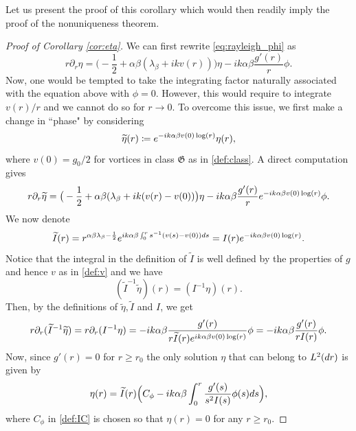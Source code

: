 \documentclass[11pt,reqno]{amsproc}
\def\dd{{\rm d}}
\def\e{{\rm e}}
\def\de{{\partial}}
\theoremstyle{definition}
\theoremstyle{definition}
\numberwithin{equation}{section}
\begin{document}
Let us present the proof of this corollary which would then readily imply the proof of the nonuniqueness theorem.
\begin{proof}[Proof of Corollary \ref{cor:eta}]
    We can first  rewrite \cref{eq:rayleigh_phi} as 
\begin{equation}
    r\de_r \eta=\big(-\frac12+\alpha\beta(\lambda_\beta+ikv(r))\big)\eta-ik\alpha\beta\frac{g'(r)}{r}\phi.
\end{equation}
Now, one would be tempted to take the integrating factor naturally associated with the equation above with $\phi=0$. However, this would require to integrate $v(r)/r$ and we cannot do so for $r\to 0$. To overcome this issue, we first make a change in ``phase" by considering \begin{equation}
    \widetilde{\eta}(r)\coloneqq \e^{-ik\alpha\beta v(0)\log(r)}\eta(r),
\end{equation}
where $v(0)=g_0/2$ for vortices in class $\mathfrak{G}$ as in \cref{def:class}. A direct computation gives 
\begin{equation}
    r\de_r\widetilde{\eta}=\big(-\frac12+\alpha\beta(\lambda_\beta+ik(v(r)-v(0))\big)\eta-ik\alpha\beta\frac{g'(r)}{r}\e^{-ik\alpha\beta v(0)\log(r)}\phi.
\end{equation}
We now denote
\begin{equation}
    \widetilde{I}(r)=r^{\alpha\beta\lambda_\beta-\frac12}\e^{ik\alpha \beta \int_0^rs^{-1}(v(s)-v(0))\dd s}=I(r)\e^{-ik\alpha\beta v(0)\log(r)}.
\end{equation}
Notice that the integral in the definition of $\widetilde{I}$ is well defined by the properties of $g$ and hence $v$ as in \cref{def:v} and we have $$(\widetilde{I}^{-1}\widetilde{\eta})(r)=(I^{-1}\eta)(r).$$ Then, by the definitions of $\widetilde{\eta},\widetilde{I}$ and $I$, we get
\begin{equation}
r\de_r(\widetilde{I}^{-1}\widetilde{\eta})=r\de_r(I^{-1}\eta)=-ik\alpha \beta \frac{g'(r)}{r\widetilde{I}(r)\e^{ik\alpha\beta v(0)\log(r)}}\phi=-ik\alpha \beta \frac{g'(r)}{rI(r)}\phi.
\end{equation}
 Now, since $g'(r)=0$ for $r\geq r_0$ the only solution $\eta$ that can belong to $L^2(\dd r)$ is given by
\begin{equation}
\eta(r)=\widetilde{I}(r)\Big(C_\phi-ik\alpha\beta \int_0^r\frac{g'(s)}{s^2I(s)} \phi(s)\dd s\Big),
\end{equation}
where $C_\phi$ in \cref{def:IC} is chosen so that $\eta(r)=0$ for any $r\geq r_0$. 


\end{proof}
\end{document}
